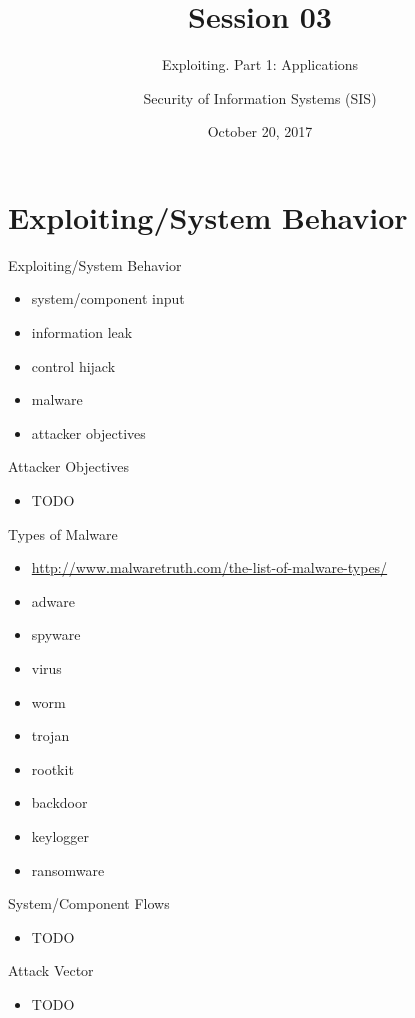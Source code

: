 \documentclass{curs}
\title[Session 03]{Session 03}
\subtitle{Exploiting. Part 1: Applications}
\author{Security of Information Systems (SIS)}
\date{October 20, 2017}
\begin{document}
\frame{\titlepage}

\section{Exploiting/System Behavior}

\begin{frame}{Exploiting/System Behavior}
  \begin{itemize}
    \item system/component input
    \item information leak
    \item control hijack
    \item malware
    \item attacker objectives
  \end{itemize}
\end{frame}

\begin{frame}{Attacker Objectives}
  \begin{itemize}
    \item TODO
  \end{itemize}
\end{frame}

\begin{frame}{Types of Malware}
  \begin{itemize}
    \item \url{http://www.malwaretruth.com/the-list-of-malware-types/}
    \item adware
    \item spyware
    \item virus
    \item worm
    \item trojan
    \item rootkit
    \item backdoor
    \item keylogger
    \item ransomware
  \end{itemize}
\end{frame}

\begin{frame}{System/Component Flows}
  \begin{itemize}
    \item TODO
  \end{itemize}
\end{frame}

\begin{frame}{Attack Vector}
  \begin{itemize}
    \item TODO
  \end{itemize}
\end{frame}
\end{document}
